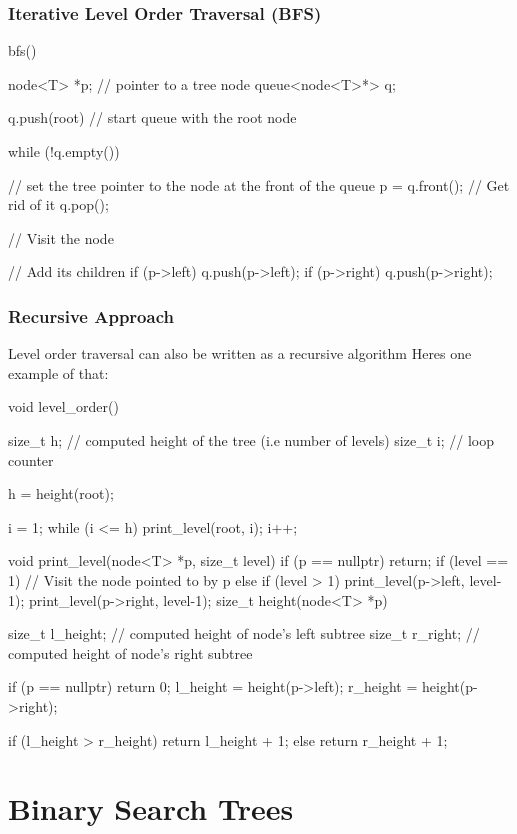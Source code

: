 \documentclass{report}
\begin{document}
\subsubsection*{Iterative Level Order Traversal (BFS)}
\begin{cppcode}
bfs() {
  node<T> *p; // pointer to a tree node 
  queue<node<T>*> q; 

  q.push(root) // start queue with the root node
  
  while (!q.empty()) {

    // set the tree pointer to the node at the front of the queue
    p = q.front();
    // Get rid of it
    q.pop();

    // Visit the node

    // Add its children
    if (p->left) {
      q.push(p->left);
    }
    if (p->right)
      q.push(p->right);
  }
}
\end{cppcode}
\subsubsection*{Recursive Approach}
Level order traversal can also be written as a recursive algorithm
\bigbreak \noindent
Heres one example of that:
\begin{cppcode}
  void level_order() {
    size_t h; // computed height of the tree (i.e number of levels)
    size_t i; // loop counter

    h = height(root);

    i = 1;
    while (i <= h) {
      print_level(root, i);
      i++;
    }
  }
  void print_level(node<T> *p, size_t level) {
    if (p == nullptr) {
      return;
    }
    if (level == 1) {
      // Visit the node pointed to by p
    }
    else if (level > 1) {
      print_level(p->left, level-1);
      print_level(p->right, level-1);
    }
  }
  size_t height(node<T> *p) {
    size_t l_height; // computed height of node's left subtree 
    size_t r_right; // computed height of node's right subtree 

    if (p == nullptr) {
      return 0;
    }
    l_height = height(p->left);
    r_height = height(p->right);

    if (l_height > r_height)
      return l_height + 1;
    else
      return r_height + 1;
  }
\end{cppcode}

\section{Binary Search Trees}
\end{document}
